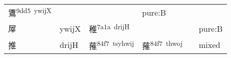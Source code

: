 \documentclass[14pt,a4paper]{scrartcl}
\begin{document}
\begin{longtable}[c]{@{}llllll@{}}
\begin{minipage}[t]{0.14\columnwidth}
鷕\textsuperscript{9dd5~ywijX}
\strut\end{minipage} &
\begin{minipage}[t]{0.14\columnwidth}\raggedright\strut
\strut\end{minipage} &
\begin{minipage}[t]{0.14\columnwidth}\raggedright\strut
\strut\end{minipage} &
\begin{minipage}[t]{0.14\columnwidth}\raggedright\strut
pure:B
\strut\end{minipage}\tabularnewline
\begin{minipage}[t]{0.14\columnwidth}\raggedright\strut
屖
\strut\end{minipage} &
\begin{minipage}[t]{0.14\columnwidth}\raggedright\strut
ywijX
\strut\end{minipage} &
\begin{minipage}[t]{0.14\columnwidth}\raggedright\strut
稚\textsuperscript{7a1a~drijH}
\strut\end{minipage} &
\begin{minipage}[t]{0.14\columnwidth}\raggedright\strut
\strut\end{minipage} &
\begin{minipage}[t]{0.14\columnwidth}\raggedright\strut
\strut\end{minipage} &
\begin{minipage}[t]{0.14\columnwidth}\raggedright\strut
pure:B
\strut\end{minipage}\tabularnewline
\begin{minipage}[t]{0.14\columnwidth}\raggedright\strut
推
\strut\end{minipage} &
\begin{minipage}[t]{0.14\columnwidth}\raggedright\strut
drijH
\strut\end{minipage} &
\begin{minipage}[t]{0.14\columnwidth}\raggedright\strut
蓷\textsuperscript{84f7~tsyhwij}
\strut\end{minipage} &
\begin{minipage}[t]{0.14\columnwidth}\raggedright\strut
蓷\textsuperscript{84f7~thwoj}
\strut\end{minipage} &
\begin{minipage}[t]{0.14\columnwidth}\raggedright\strut
\strut\end{minipage} &
\begin{minipage}[t]{0.14\columnwidth}\raggedright\strut
mixed
\strut\end{minipage}\tabularnewline
\bottomrule
\end{longtable}
\end{document}
